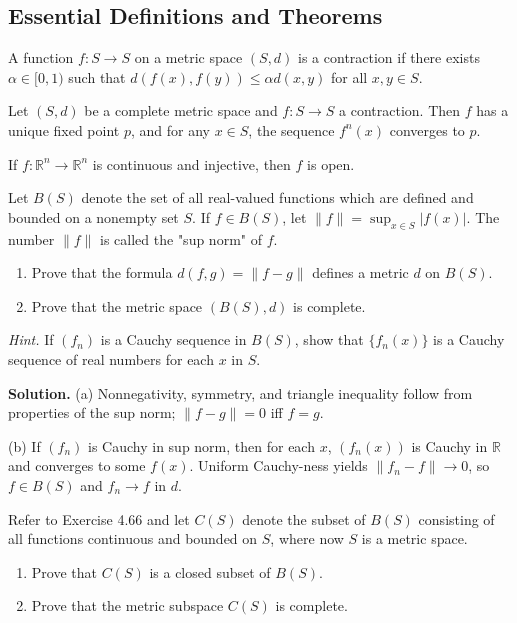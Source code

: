 \subsection*{Essential Definitions and Theorems}

\begin{definition}
A function $f: S \to S$ on a metric space $(S,d)$ is a contraction if there exists $\alpha \in [0,1)$ such that $d(f(x), f(y)) \leq \alpha d(x,y)$ for all $x,y \in S$.
\end{definition}

\begin{theorem}
Let $(S,d)$ be a complete metric space and $f: S \to S$ a contraction. Then $f$ has a unique fixed point $p$, and for any $x \in S$, the sequence $f^n(x)$ converges to $p$.
\end{theorem}

\begin{theorem}
If $f: \mathbb{R}^n \to \mathbb{R}^n$ is continuous and injective, then $f$ is open.
\end{theorem}

\begin{problembox}
Let $B(S)$ denote the set of all real-valued functions which are defined and bounded on a nonempty set $S$. If $f \in B(S)$, let $\|f\| = \sup_{x \in S} |f(x)|$. The number $\|f\|$ is called the "sup norm" of $f$.
\begin{enumerate}[label=(\alph*)]
\item Prove that the formula $d(f, g) = \|f - g\|$ defines a metric $d$ on $B(S)$.
\item Prove that the metric space $(B(S), d)$ is complete. 
\end{enumerate}
\textit{Hint.} If $(f_n)$ is a Cauchy sequence in $B(S)$, show that $\{f_n(x)\}$ is a Cauchy sequence of real numbers for each $x$ in $S$.
\end{problembox}

\noindent\textbf{Solution.}
(a) Nonnegativity, symmetry, and triangle inequality follow from properties of the sup norm; $\|f-g\|=0$ iff $f=g$.

(b) If $(f_n)$ is Cauchy in sup norm, then for each $x$, $(f_n(x))$ is Cauchy in $\mathbb{R}$ and converges to some $f(x)$. Uniform Cauchy-ness yields $\|f_n-f\|\to 0$, so $f\in B(S)$ and $f_n\to f$ in $d$.
\medskip

\begin{problembox}
Refer to Exercise 4.66 and let $C(S)$ denote the subset of $B(S)$ consisting of all functions continuous and bounded on $S$, where now $S$ is a metric space.
\begin{enumerate}[label=(\alph*)]
\item Prove that $C(S)$ is a closed subset of $B(S)$.
\item Prove that the metric subspace $C(S)$ is complete.
\end{enumerate}
\end{problembox}

